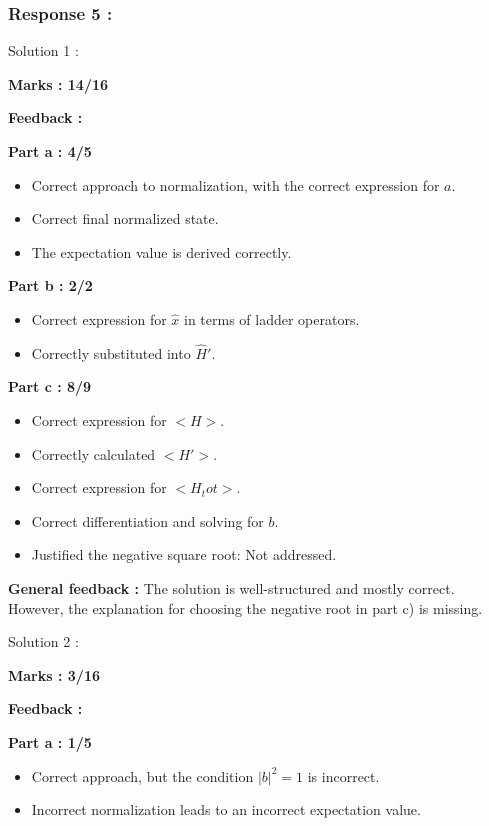 \documentclass[a4paper,11pt]{article}
\begin{document}
\subsubsection*{Response 5 :}

Solution 1 :

\textbf{Marks : 14/16}

\textbf{Feedback :}

\textbf{Part a : 4/5}

\begin{itemize}
    \item Correct approach to normalization, with the correct expression for $a$.
    \item Correct final normalized state.
    \item The expectation value is derived correctly.
\end{itemize}

\textbf{Part b : 2/2}

\begin{itemize}
    \item Correct expression for $\hat{x}$ in terms of ladder operators.
    \item Correctly substituted into $\hat{H}'$.
\end{itemize}

\textbf{Part c : 8/9}

\begin{itemize}
    \item Correct expression for $<H>$.
    \item Correctly calculated $<H'>$.
    \item Correct expression for $<H_tot>$.
    \item Correct differentiation and solving for $b$.
    \item Justified the negative square root: Not addressed.
\end{itemize}

\textbf{General feedback :}
The solution is well-structured and mostly correct. However, the explanation for choosing the negative root in part c) is missing.


Solution 2 :

\textbf{Marks : 3/16}

\textbf{Feedback :}

\textbf{Part a : 1/5}

\begin{itemize}
    \item Correct approach, but the condition $|b|^2 = 1$ is incorrect.
    \item Incorrect normalization leads to an incorrect expectation value.
\end{itemize}
\end{document}
